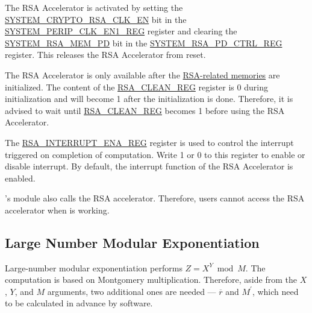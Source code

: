 \documentclass[main\_\_EN.tex]{subfiles}
\begin{document}
The RSA Accelerator is activated by setting the \hyperref[fielddesc:SYSTEMCRYPTORSACLKEN]{SYSTEM\_CRYPTO\_RSA\_CLK\_EN} bit in the \hyperref[regdesc:SYSTEMPERIPCLKEN1REG]{SYSTEM\_PERIP\_CLK\_EN1\_REG} register and clearing the \hyperref[fielddesc:SYSTEMRSAMEMPD]{SYSTEM\_RSA\_MEM\_PD} bit in the \hyperref[regdesc:SYSTEMRSAPDCTRLREG]{SYSTEM\_RSA\_PD\_CTRL\_REG} register. This releases the RSA Accelerator from reset.

The RSA Accelerator is only available after the \hyperref[sec:mem-sum]{RSA-related memories} are initialized. The content of the \hyperref[regdesc:RSACLEANREG]{RSA\_CLEAN\_REG} register is 0 during initialization and will become 1 after the initialization is done. Therefore, it is advised to wait until \hyperref[regdesc:RSACLEANREG]{RSA\_CLEAN\_REG} becomes 1 before using the RSA Accelerator.

The \hyperref[regdesc:RSAINTERRUPTENAREG]{RSA\_INTERRUPT\_ENA\_REG} register is used to control the interrupt triggered on completion of computation. Write 1 or 0 to this register to enable or disable interrupt. By default, the interrupt function of the RSA Accelerator is enabled.

\begin{importantlisting}
\vspace{-0.5em}

    \chipname{}'s  module also calls the RSA accelerator. Therefore, users cannot access the RSA accelerator when  is working.
\end{importantlisting}

\subsection{Large Number Modular Exponentiation} \label{sec:rsa-large-modular-Exponentiation}

Large-number modular exponentiation performs \begin{math}Z = X^{Y} \bmod M\end{math}. The computation is based on Montgomery multiplication. Therefore, aside from the \begin{math}X\end{math},
\begin{math}Y\end{math}, and
\begin{math}M\end{math} arguments, two additional ones are needed --- \begin{math}\overline{r}\end{math} and
\begin{math}M^{\prime}\end{math}, which need to be calculated in advance by software.
\end{document}
